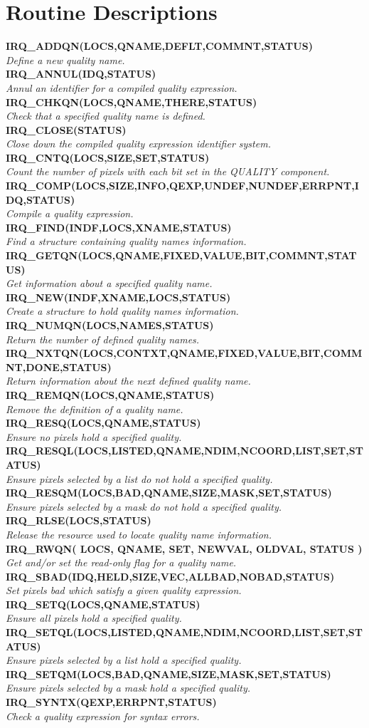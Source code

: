 \appendix
\section {Routine Descriptions}

\newcommand{\noteroutine}[2]{{\small \bf #1} \\
                              \hspace*{3em} {\em #2} \\[1.5ex]}

\noteroutine{IRQ\_ADDQN(LOCS,QNAME,DEFLT,COMMNT,STATUS)}
   {Define a new quality name.}
\noteroutine{IRQ\_ANNUL(IDQ,STATUS)}
   {Annul an identifier for a compiled quality expression.}
\noteroutine{IRQ\_CHKQN(LOCS,QNAME,THERE,STATUS)}
   {Check that a specified quality name is defined.}
\noteroutine{IRQ\_CLOSE(STATUS)}
   {Close down the compiled quality expression identifier system.}
\noteroutine{IRQ\_CNTQ(LOCS,SIZE,SET,STATUS)}
   {Count the number of pixels with each bit set in the QUALITY component.}
\noteroutine{IRQ\_COMP(LOCS,SIZE,INFO,QEXP,UNDEF,NUNDEF,ERRPNT,IDQ,STATUS)}
   {Compile a quality expression.}
\noteroutine{IRQ\_FIND(INDF,LOCS,XNAME,STATUS)}
   {Find a structure containing quality names information.}
\noteroutine{IRQ\_GETQN(LOCS,QNAME,FIXED,VALUE,BIT,COMMNT,STATUS)}
   {Get information about a specified quality name.}
\noteroutine{IRQ\_NEW(INDF,XNAME,LOCS,STATUS)}
   {Create a structure to hold quality names information.}
\noteroutine{IRQ\_NUMQN(LOCS,NAMES,STATUS)}
   {Return the number of defined quality names.}
\noteroutine{IRQ\_NXTQN(LOCS,CONTXT,QNAME,FIXED,VALUE,BIT,COMMNT,DONE,STATUS)}
   {Return information about the next defined quality name.}
\noteroutine{IRQ\_REMQN(LOCS,QNAME,STATUS)}
   {Remove the definition of a quality name.}
\noteroutine{IRQ\_RESQ(LOCS,QNAME,STATUS)}
   {Ensure no pixels hold a specified quality.}
\noteroutine{IRQ\_RESQL(LOCS,LISTED,QNAME,NDIM,NCOORD,LIST,SET,STATUS)}
   {Ensure pixels selected by a list do not hold a specified quality.}
\noteroutine{IRQ\_RESQM(LOCS,BAD,QNAME,SIZE,MASK,SET,STATUS)}
   {Ensure pixels selected by a mask do not hold a specified quality.}
\noteroutine{IRQ\_RLSE(LOCS,STATUS)}
   {Release the resource used to locate quality name information.}
\noteroutine{IRQ\_RWQN( LOCS, QNAME, SET, NEWVAL, OLDVAL, STATUS )}
   {Get and/or set the read-only flag for a quality name.}
\noteroutine{IRQ\_SBAD(IDQ,HELD,SIZE,VEC,ALLBAD,NOBAD,STATUS)}
   {Set pixels bad which satisfy a given quality expression.}
\noteroutine{IRQ\_SETQ(LOCS,QNAME,STATUS)}
   {Ensure all pixels hold a specified quality.}
\noteroutine{IRQ\_SETQL(LOCS,LISTED,QNAME,NDIM,NCOORD,LIST,SET,STATUS)}
   {Ensure pixels selected by a list hold a specified quality.}
\noteroutine{IRQ\_SETQM(LOCS,BAD,QNAME,SIZE,MASK,SET,STATUS)}
   {Ensure pixels selected by a mask hold a specified quality.}
\noteroutine{IRQ\_SYNTX(QEXP,ERRPNT,STATUS)}
   {Check a quality expression for syntax errors.}

